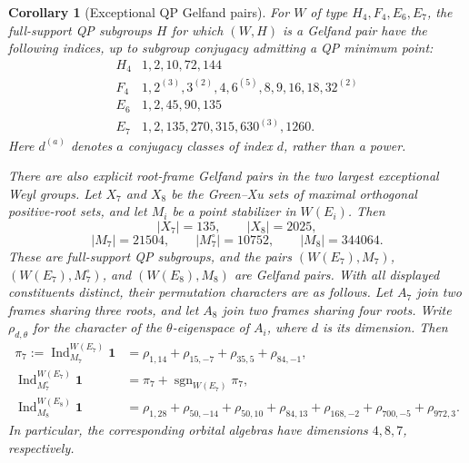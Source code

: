 \documentclass[11pt]{article}
\numberwithin{equation}{section}
\newtheorem{corollary}[theorem]{Corollary}
\theoremstyle{definition}
\DeclareMathOperator{\Ind}{Ind}
\DeclareMathOperator{\sgn}{sgn}
\newcommand{\one}{\mathbf 1}
\begin{document}
\begin{corollary}[Exceptional QP Gelfand pairs]
\label{cor:exceptionalGelfand}
For \(W\) of type \(H_4,F_4,E_6,E_7\), the full-support QP subgroups
\(H\) for which \((W,H)\) is a Gelfand pair have the following indices,
up to subgroup conjugacy admitting a QP minimum point:
\[
\begin{array}{c|l}
 H_4&1,2,10,72,144\\
 F_4&1,2^{(3)},3^{(2)},4,6^{(5)},8,9,16,18,32^{(2)}\\
 E_6&1,2,45,90,135\\
 E_7&1,2,135,270,315,630^{(3)},1260.
\end{array}
\]
Here \(d^{(a)}\) denotes \(a\) conjugacy classes of index \(d\),
rather than a power.

There are also explicit root-frame Gelfand pairs in the two largest
exceptional Weyl groups.  Let \(X_7\) and \(X_8\) be the Green--Xu
sets of maximal orthogonal positive-root sets, and let
\(M_i\) be a point stabilizer in \(W(E_i)\).  Then
\[
 |X_7|=135,\qquad |X_8|=2025,
\]
\[
 |M_7|=21504,\qquad |M_7^\circ|=10752,
 \qquad |M_8|=344064.
\]
These are full-support QP subgroups, and the pairs
\((W(E_7),M_7)\), \((W(E_7),M_7^\circ)\), and
\((W(E_8),M_8)\) are Gelfand pairs.  With all displayed constituents
distinct, their permutation characters are as follows.  Let \(A_7\)
join two frames sharing three roots, and let \(A_8\) join two frames
sharing four roots.  Write \(\rho_{d,\theta}\) for the character of the
\(\theta\)-eigenspace of \(A_i\), where \(d\) is its dimension.  Then
\begin{align}
 \pi_7:=\Ind_{M_7}^{W(E_7)}\one
   &=\rho_{1,14}+\rho_{15,-7}+\rho_{35,5}+\rho_{84,-1},
   \label{eq:E7framecharacter}\\
 \Ind_{M_7^\circ}^{W(E_7)}\one
   &=\pi_7+\sgn_{W(E_7)}\pi_7,
   \label{eq:E7evenframecharacter}\\
 \Ind_{M_8}^{W(E_8)}\one
   &=\rho_{1,28}+\rho_{50,-14}+\rho_{50,10}+
     \rho_{84,13}+\rho_{168,-2}+\rho_{700,-5}+\rho_{972,3}.
   \label{eq:E8framecharacter}
\end{align}
In particular, the corresponding orbital algebras have dimensions
\(4,8,7\), respectively.
\end{corollary}
\end{document}
